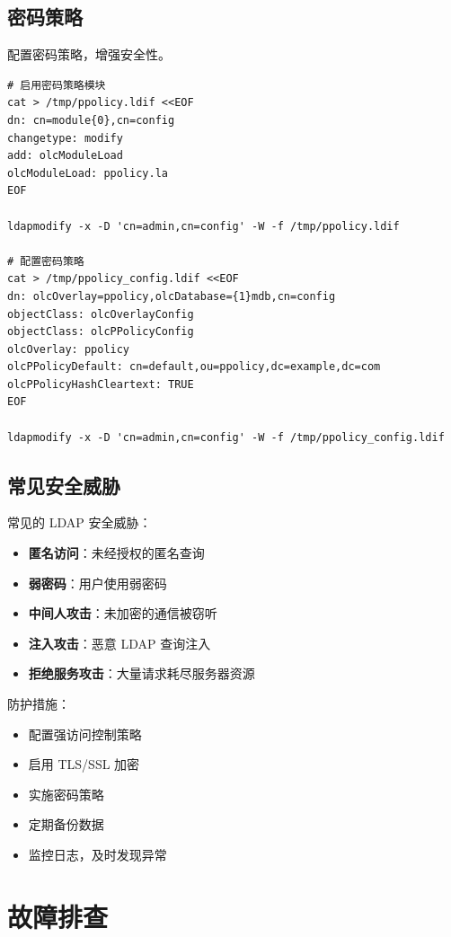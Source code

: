 \documentclass[12pt,UTF8]{ctexbook}
\begin{document}
\section{密码策略}
\label{sec:password_policy}

配置密码策略，增强安全性。

\begin{verbatim}
# 启用密码策略模块
cat > /tmp/ppolicy.ldif <<EOF
dn: cn=module{0},cn=config
changetype: modify
add: olcModuleLoad
olcModuleLoad: ppolicy.la
EOF

ldapmodify -x -D 'cn=admin,cn=config' -W -f /tmp/ppolicy.ldif

# 配置密码策略
cat > /tmp/ppolicy_config.ldif <<EOF
dn: olcOverlay=ppolicy,olcDatabase={1}mdb,cn=config
objectClass: olcOverlayConfig
objectClass: olcPPolicyConfig
olcOverlay: ppolicy
olcPPolicyDefault: cn=default,ou=ppolicy,dc=example,dc=com
olcPPolicyHashCleartext: TRUE
EOF

ldapmodify -x -D 'cn=admin,cn=config' -W -f /tmp/ppolicy_config.ldif
\end{verbatim}

\section{常见安全威胁}
\label{sec:security_threats}

常见的 LDAP 安全威胁：

\begin{itemize}
    \item \textbf{匿名访问}：未经授权的匿名查询
    \item \textbf{弱密码}：用户使用弱密码
    \item \textbf{中间人攻击}：未加密的通信被窃听
    \item \textbf{注入攻击}：恶意 LDAP 查询注入
    \item \textbf{拒绝服务攻击}：大量请求耗尽服务器资源
\end{itemize}

防护措施：
\begin{itemize}
    \item 配置强访问控制策略
    \item 启用 TLS/SSL 加密
    \item 实施密码策略
    \item 定期备份数据
    \item 监控日志，及时发现异常
\end{itemize}

\chapter{故障排查}
\label{chap:troubleshooting}
\end{document}
